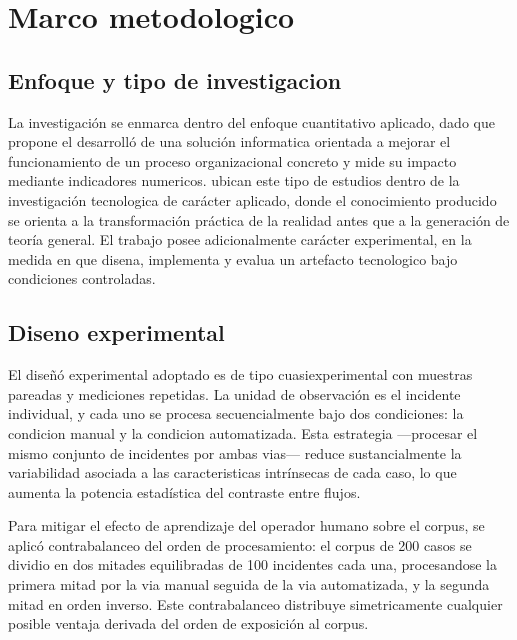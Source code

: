 \section{Marco metodologico}

\subsection{Enfoque y tipo de investigacion}

La investigación se enmarca dentro del enfoque cuantitativo aplicado, dado que propone el desarrolló de una solución informatica orientada a mejorar el funcionamiento de un proceso organizacional concreto y mide su impacto mediante indicadores numericos. \textcite{HernandezSampieri2018_metodologia} ubican este tipo de estudios dentro de la investigación tecnologica de carácter aplicado, donde el conocimiento producido se orienta a la transformación práctica de la realidad antes que a la generación de teoría general. El trabajo posee adicionalmente carácter experimental, en la medida en que disena, implementa y evalua un artefacto tecnologico bajo condiciones controladas.

\subsection{Diseno experimental}

El diseñó experimental adoptado es de tipo cuasiexperimental con muestras pareadas y mediciones repetidas. La unidad de observación es el incidente individual, y cada uno se procesa secuencialmente bajo dos condiciones: la condicion manual y la condicion automatizada. Esta estrategia ---procesar el mismo conjunto de incidentes por ambas vias--- reduce sustancialmente la variabilidad asociada a las caracteristicas intrínsecas de cada caso, lo que aumenta la potencia estadística del contraste entre flujos.

Para mitigar el efecto de aprendizaje del operador humano sobre el corpus, se aplicó contrabalanceo del orden de procesamiento: el corpus de 200 casos se dividio en dos mitades equilibradas de 100 incidentes cada una, procesandose la primera mitad por la via manual seguida de la via automatizada, y la segunda mitad en orden inverso. Este contrabalanceo distribuye simetricamente cualquier posible ventaja derivada del orden de exposición al corpus.

